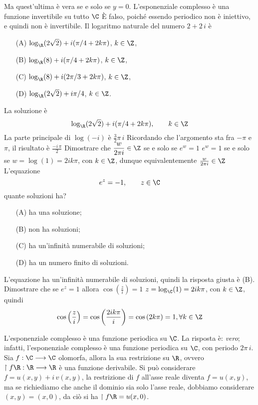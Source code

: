 Ma quest'ultima è vera se e solo se $y=0$.
    L'esponenziale complesso è una funzione invertibile su tutto $ \C $
    È falso, poiché essendo periodico non è iniettivo, e quindi non è invertibile.
    Il logaritmo naturale del numero $ 2+2\,i $ è \begin{itemize}
        \item[(A)] $\log_{\R} (2\sqrt{2})+i(\pi/4+2k\pi)$, $ k \in \Z $, 
        \item[(B)] $\log_{\R}(8)+i(\pi/4+2k\pi)$, $ k \in \Z $, 
        \item[(C)] $\log_{\R}(8)+i(2\pi/3+2k\pi)$, $ k \in \Z $, 
        \item[(D)]$\log_{\R}(2\sqrt{2})+i\pi/4$, $ k \in \Z $.
    \end{itemize}
    La soluzione è \[
        \log_{\R} (2\sqrt{2})+i(\pi/4+2k\pi),\qquad k \in \Z
    \]
    La parte principale di $ \log(-i) $ è $ \frac{3}{2}\pi\,i $
Ricordando che l'argomento sta fra $-\pi$ e $\pi$, il risultato è $\frac{-i\,\pi}{2}$ 
    Dimostrare che $\displaystyle \frac{w}{2\pi i}  \in \Z$ se e solo se $\displaystyle e^w=1$   
    $e^w=1$ se e solo se $w=\log(1)=2ik\pi$, con $k \in \Z$, dunque equivalentemente $\frac{w}{2\pi i}  \in \Z$
    L'equazione \[
        e^{z} = -1,\qquad z \in \C
    \]quante soluzioni ha? \begin{itemize}
        \item[(A)] ha una soluzione; 
        \item[(B)] non ha soluzioni; 
        \item[(C)] ha un'infinità numerabile di soluzioni; 
        \item[(D)] ha un numero finito di soluzioni.
    \end{itemize}
    L'equazione ha un'infinità numerabile di soluzioni, quindi la risposta giusta è (B). 
    Dimostrare che se $e^z=1$ allora $\cos(\frac{z}{i})=1$
    $z=\log_{\C} (1)=2ik\pi$, con $k \in \Z$, quindi \[
        \cos\left(\frac{z}{i}\right)=\cos\left(\frac{2ik\pi}{i}\right)=\cos\left(2k\pi\right)=1, \forall k \in \Z
    \]

L'esponenziale complesso è una funzione periodica su $ \C $.
    La risposta è: \emph{vero}; infatti, l'esponenziale complesso è una funzione periodica su $ \C $, con periodo $ 2\pi \,i $.
    Sia $f : \C \longrightarrow \C$ olomorfa, allora la sua restrizione su $\R$, ovvero $\restriction{f}{\R} : \R \longrightarrow \R$ è una funzione derivabile.
    Si può considerare $f = u(x,y) + i\, v(x,y)$, la restrizione di $f$ all'asse reale diventa $f = u(x,y)$, ma se richiediamo che anche il dominio sia solo l'asse reale, dobbiamo considerare $(x,y) = (x,0)$, da ciò si ha
    $\restriction{f}{\R} = u(x,0)$. 
    
